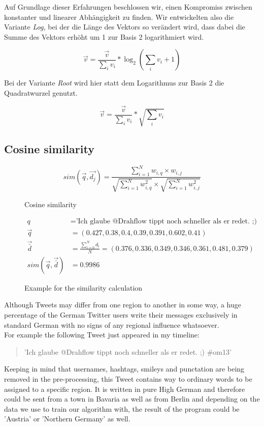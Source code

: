 \documentclass[../Main.tex]{subfiles}
\begin{document}
Auf Grundlage dieser Erfahrungen beschlossen wir, einen Kompromiss zwischen konstanter und linearer Abhängigkeit zu finden. Wir entwickelten also die Variante \textit{Log,} bei der die Länge des Vektors so verändert wird, dass dabei die Summe des Vektors erhöht um 1 zur Basis 2 logarithmiert wird.

$$\vec v = \frac{\vec v}{\sum_i v_i} * \log_2(\sum_i v_i+1)$$

Bei der Variante \textit{Root} wird hier statt dem Logarithmus zur Basis 2 die Quadratwurzel genutzt.

$$\vec v = \frac{\vec v}{\sum_i v_i} * \sqrt{\sum_i v_i}$$

\subsection{Cosine similarity}
\begin{figure}
  \[ sim(\vec{q},\vec{d_j}) = \frac{\sum^N_{i=1} w_{i,q} \times w_{i,j}}{\sqrt{\sum^N_{i=1}w^2_{i,q}} \times \sqrt{\sum^N_{i=1}w^2_{i,j}}} \]
  \caption{Cosine similarity}
  \label{cos_sim}
\end{figure}
\begin{figure}
 \begin{align*}
  q &= \textrm{'Ich glaube @Drahflow tippt noch schneller als er redet. ;) \#om13' } \\
  \vec{q} &= (0.427, 0.38, 0.4, 0.39, 0.391, 0.602,  0.41) \\ 
   \vec{\bar{d}} &= \frac{\sum^N_{i=0} d_i}{N} =  (0.376, 0.336, 0.349, 0.346, 0.361, 0.481,  0.379) \\
  sim(\vec{q}, \vec{\bar{d}}) &= 0.9986 
\end{align*}
  \caption{Example for the similarity calculation}
  \label{cos_sim_example}
\end{figure}
Although Tweets may differ from one region to another in some way, a huge percentage of the German Twitter users write their messages exclusively in standard German with no signs of any regional influence whatsoever.  \\
For example the following Tweet just appeared in my timeline:
\begin{quote}
'Ich glaube @Drahflow tippt noch schneller als er redet. ;) \#om13'
\end{quote}
Keeping in mind that  usernames, hashtags, smileys and punctation are being removed in the pre-processing, this Tweet contains way to ordinary words to be assigned to a specific region. It is written in pure High German and therefore could be sent from a town in Bavaria as well as from Berlin and depending on the data we use to train our algorithm with, the result of the program could be 'Austria' or 'Northern Germany' as well.
\end{document}

